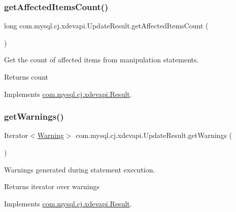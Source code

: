 \subsubsection{\texorpdfstring{get\+Affected\+Items\+Count()}{getAffectedItemsCount()}}
{\footnotesize\ttfamily long com.\+mysql.\+cj.\+xdevapi.\+Update\+Result.\+get\+Affected\+Items\+Count (\begin{DoxyParamCaption}{ }\end{DoxyParamCaption})}

Get the count of affected items from manipulation statements.

\begin{DoxyReturn}{Returns}
count 
\end{DoxyReturn}


Implements \mbox{\hyperlink{interfacecom_1_1mysql_1_1cj_1_1xdevapi_1_1_result_a6389cfd50f26c8efc0120b5f3072d228}{com.\+mysql.\+cj.\+xdevapi.\+Result}}.

\mbox{\label{classcom_1_1mysql_1_1cj_1_1xdevapi_1_1_update_result_a44b96bc6ac3193b0f276a8317d48b5b3}} 
\subsubsection{\texorpdfstring{get\+Warnings()}{getWarnings()}}
{\footnotesize\ttfamily Iterator$<$\mbox{\hyperlink{interfacecom_1_1mysql_1_1cj_1_1protocol_1_1_warning}{Warning}}$>$ com.\+mysql.\+cj.\+xdevapi.\+Update\+Result.\+get\+Warnings (\begin{DoxyParamCaption}{ }\end{DoxyParamCaption})}

Warnings generated during statement execution.

\begin{DoxyReturn}{Returns}
iterator over warnings 
\end{DoxyReturn}


Implements \mbox{\hyperlink{interfacecom_1_1mysql_1_1cj_1_1xdevapi_1_1_result_a7bd12aba36fc02a31c8fd546fe731e98}{com.\+mysql.\+cj.\+xdevapi.\+Result}}.

\mbox{\label{classcom_1_1mysql_1_1cj_1_1xdevapi_1_1_update_result_a5a4640f6081699843d69643728e1038b}} 

